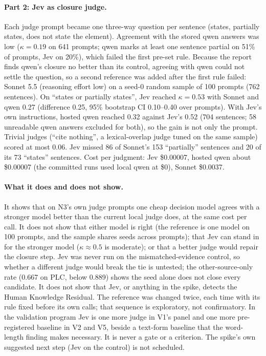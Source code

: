 \paragraph{Part 2: Jev as closure judge.} \evobs{} Each judge prompt became one three-way question per
sentence (states, partially states, does not state the element). Agreement with the stored qwen answers
was low ($\kappa = 0.19$ on 641 prompts; qwen marks at least one sentence partial on 51\% of prompts, Jev
on 20\%), which failed the first pre-set rule. Because the report finds qwen's closure no better than its
control, agreeing with qwen could not settle the question, so a second reference was added after the
first rule failed: Sonnet 5.5 (reasoning effort low) on a seed-0 random sample of 100 prompts (762
sentences). On \enquote{states or partially states}, Jev reached $\kappa = 0.53$ with Sonnet and qwen
0.27 (difference 0.25, 95\% bootstrap CI 0.10--0.40 over prompts). With Jev's own instructions, hosted
qwen reached 0.32 against Jev's 0.52 (704 sentences; 58 unreadable qwen answers excluded for both), so
the gain is not only the prompt. Trivial judges (\enquote{cite nothing}, a lexical-overlap judge tuned on
the same sample) scored at most 0.06. Jev missed 86 of Sonnet's 153 \enquote{partially} sentences and 20
of its 73 \enquote{states} sentences. Cost per judgment: Jev \$0.00007, hosted qwen about \$0.00007
(the committed runs used local qwen at \$0), Sonnet \$0.0037.

\paragraph{What it does and does not show.} \evint{} It shows that on N3's own judge prompts one cheap
decision model agrees with a stronger model better than the current local judge does, at the same cost
per call. It does not show that either model is right (the reference is one model on 100 prompts, and
the sample shares seeds across prompts); that Jev can stand in for the stronger model ($\kappa \approx
0.5$ is moderate); or that a better judge would repair the closure step. Jev was never run on the mismatched-evidence control, so whether a different judge would break the tie is untested; the other-source-only rate (0.667 on PLC, below 0.889) shows the seed alone does not close every candidate. It does not show that Jev, or anything in the spike, detects the Human Knowledge
Residual. The reference was changed twice, each time with its rule fixed before its own calls; that
sequence is exploratory, not confirmatory. \evfut{} In the validation program Jev is one more judge in
V1's panel and one more pre-registered baseline in V2 and V5, beside a text-form baseline that the
word-length finding makes necessary. It is never a gate or a criterion. The spike's own suggested next
step (Jev on the control) is not scheduled.

